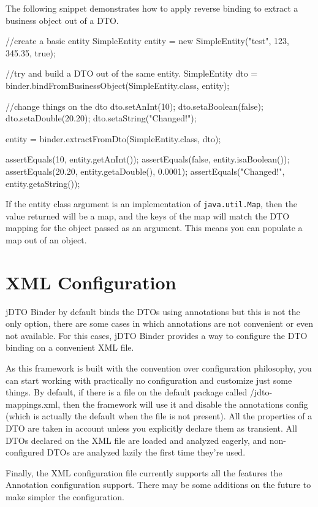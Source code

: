 \documentclass[11pt]{article}
\newcommand{\JDTO}{jDTO Binder\xspace}
\newcommand{\DEFAULTCONFIG}{/jdto-mappings.xml\xspace}
\begin{document}
The following snippet demonstrates how to apply reverse binding to extract a business object out of a DTO.


\begin{java}
//create a basic entity
SimpleEntity entity = new SimpleEntity("test", 123, 345.35, true);

//try and build a DTO out of the same entity.
SimpleEntity dto = 
    binder.bindFromBusinessObject(SimpleEntity.class, entity);

//change things on the dto
dto.setAnInt(10);
dto.setaBoolean(false);
dto.setaDouble(20.20);
dto.setaString("Changed!");

entity = binder.extractFromDto(SimpleEntity.class, dto);


assertEquals(10, entity.getAnInt());
assertEquals(false, entity.isaBoolean());
assertEquals(20.20, entity.getaDouble(), 0.0001);
assertEquals("Changed!", entity.getaString());
\end{java}


If the entity class argument is an implementation of \texttt{java.util.Map}, then the value returned will be a map, and the keys of the map will match the DTO mapping for the object passed as an argument. This means you can populate a map out of an object.


\section{XML Configuration}

\JDTO by default binds the DTOs using annotations but this is not the only option, there are some cases in which annotations are not convenient or even not available. For this cases, \JDTO provides a way to configure the DTO binding on a convenient XML file.

As this framework is built with the convention over configuration philosophy, you can start working with practically no configuration and customize just some things. By default, if there is a file on the default package called \DEFAULTCONFIG, then the framework will use it and disable the annotations config (which is actually the default when the file is not present). All the properties of a DTO are taken in account unless you explicitly declare them as transient. All DTOs declared on the XML file are loaded and analyzed eagerly, and non-configured DTOs are analyzed lazily the first time they're used.

Finally, the XML configuration file currently supports all the features the Annotation configuration support. There may be some additions on the future to make simpler the configuration.
\end{document}
